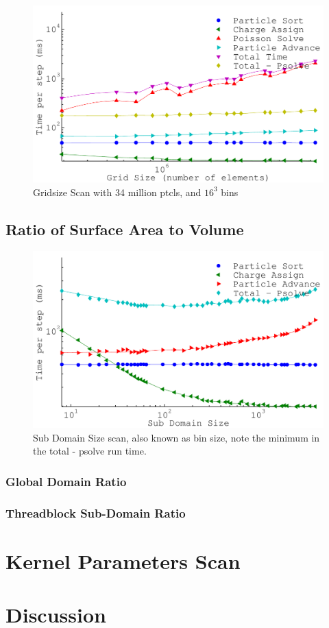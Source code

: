 \begin{figure}[h]
\begin{center}
\includegraphics[width=6in]{performance/gridsize_scan34ptcls16bins.pdf}
\end{center}
\caption{Gridsize Scan with 34 million ptcls, and $16^3$ bins}
\label{fig:nptclsize_scan128x64x64}
\end{figure}


		\subsection{Ratio of Surface Area to Volume}
\begin{figure}[h]
\begin{center}
\includegraphics[width=6in]{performance/gridshape_scan.pdf}
\end{center}
\caption{Sub Domain Size scan, also known as bin size, note the minimum in the total - psolve run time.}
\label{fig:subdomain_size_scan}
\end{figure}

			\subsubsection{Global Domain Ratio}
			\subsubsection{Threadblock Sub-Domain Ratio}

	\section{Kernel Parameters Scan}

	\section{Discussion}
